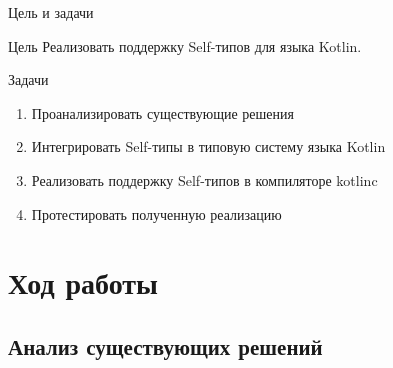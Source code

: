 \documentclass[aspectratio=169,usenames,dvipsnames]{beamer}
\begin{document}
    \begin{frame}[fragile]{Цель и задачи}

        \begin{block}{Цель}
            Реализовать поддержку Self-типов для языка Kotlin.
        \end{block}

        \begin{block}{Задачи}
            \begin{enumerate}
                \item Проанализировать существующие решения
                \item Интегрировать Self-типы в типовую систему языка Kotlin
                \item Реализовать поддержку Self-типов в компиляторе kotlinc
                \item Протестировать полученную реализацию
            \end{enumerate}
        \end{block}
    \end{frame}


    \section{Ход работы}


    \subsection{Анализ существующих решений}
\end{document}
